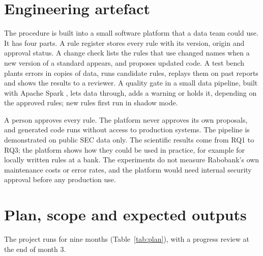 \documentclass[11pt,a4paper]{article}
\let\oldsection\section
\renewcommand{\section}{\FloatBarrier\oldsection}
\begin{document}
\section{Engineering artefact}
\label{sec:platform}

The procedure is built into a small software platform that a data team could use. It has four parts. A rule register stores every rule with its version, origin and approval status. A change check lists the rules that use changed names when a new version of a standard appears, and proposes updated code. A test bench plants errors in copies of data, runs candidate rules, replays them on past reports and shows the results to a reviewer. A quality gate in a small data pipeline, built with Apache Spark \cite{spark}, lets data through, adds a warning or holds it, depending on the approved rules; new rules first run in shadow mode.

A person approves every rule. The platform never approves its own proposals, and generated code runs without access to production systems. The pipeline is demonstrated on public SEC data only. The scientific results come from RQ1 to RQ3; the platform shows how they could be used in practice, for example for locally written rules at a bank. The experiments do not measure Rabobank's own maintenance costs or error rates, and the platform would need internal security approval before any production use.

\section{Plan, scope and expected outputs}
\label{sec:plan}

The project runs for nine months (Table~\ref{tab:plan}), with a progress review at the end of month 3.
\end{document}
